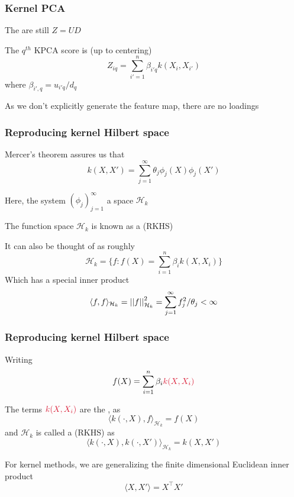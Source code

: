 \documentclass{beamer}
\begin{document}
\begin{frame}[fragile]
  \frametitle{Kernel PCA}

The  are still $Z = UD$

\vsp
The $q^{th}$ KPCA score is (up to centering)
\[
Z_{iq} = \sum_{i'=1}^n \beta_{i'q} k(X_i,X_{i'})
\]
where $\beta_{i',q} = u_{i'q}/d_q$
\vsp


 As we don't explicitly generate the feature map, there are no loadings
\end{frame}

\begin{frame}[fragile]
  \frametitle{Reproducing kernel Hilbert space}
        Mercer's theorem assures us that 
\[
k(X,X') = \sum_{j=1}^\infty \theta_j \phi_j(X)\phi_j(X')
\]

\vsp
Here, the system $(\phi_j)_{j=1}^\infty$  a space $\mathcal{H}_k$

\vsp
The function space $\mathcal{H}_k$ is known as a  (RKHS)

\vsp
It can also be thought of as roughly
\[
\mathcal{H}_k = \{f: f(X) = \sum_{i=1}^n \beta_ik(X,X_i)\}
\]
Which has a special inner product
\[
\langle f, f \rangle_{\mathcal{H}_k} = \left|\left| f \right|\right|_{\mathcal{H}_k}^2 = \sum_{j=1}^\infty f_j^2/\theta_j < \infty
\]
\end{frame}

\begin{frame}
  \frametitle{Reproducing kernel Hilbert space}
Writing
\[
f(X) = \sum_{i=1}^n \beta_i \alr{k(X,X_i)}
\]

The terms $\alr{k(X,X_i)}$ are the , as
\[
\langle k(\cdot,X), f \rangle_{\mathcal{H}_k} = f(X)
\]
and $\mathcal{H}_k$ is called a  (RKHS) as
\[
\langle k(\cdot,X),k(\cdot,X') \rangle_{\mathcal{H}_k} = k(X,X')
\]
\vvsp

 For kernel methods, we are generalizing the finite dimensional Euclidean inner product 
\[
\langle X, X' \rangle  = X^{\top} X'
\]
\end{frame}
\end{document}
